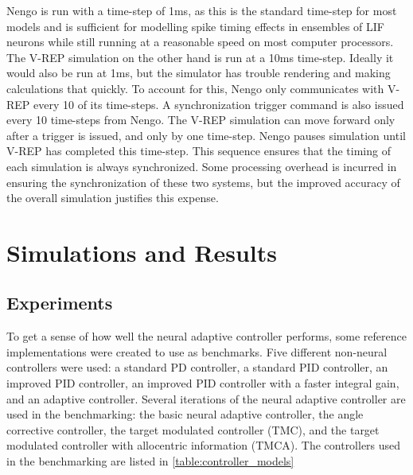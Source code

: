 \documentclass[letterpaper,12pt,titlepage,oneside,final]{book}
\begin{document}
Nengo is run with a time-step of 1ms, as this is the standard time-step for most models and is sufficient for modelling spike timing effects in ensembles of LIF neurons while still running at a reasonable speed on most computer processors. 
The V-REP simulation on the other hand is run at a 10ms time-step. 
Ideally it would also be run at 1ms, but the simulator has trouble rendering and making calculations that quickly. 
To account for this, Nengo only communicates with V-REP every 10 of its time-steps. 
A synchronization trigger command is also issued every 10 time-steps from Nengo. 
The V-REP simulation can move forward only after a trigger is issued, and only by one time-step. 
Nengo pauses simulation until V-REP has completed this time-step. 
This sequence ensures that the timing of each simulation is always synchronized. 
Some processing overhead is incurred in ensuring the synchronization of these two systems, but the improved accuracy of the overall simulation justifies this expense. 

\chapter{Simulations and Results} \label{chap:analysis}

\section{Experiments}


To get a sense of how well the neural adaptive controller performs, some reference implementations were created to use as benchmarks. 
Five different non-neural controllers were used: a standard PD controller, a standard PID controller, an improved PID controller, an improved PID controller with a faster integral gain, and an adaptive controller. 
Several iterations of the neural adaptive controller are used in the benchmarking: the basic neural adaptive controller, the angle corrective controller, the target modulated controller (TMC), and the target modulated controller with allocentric information (TMCA). %
The controllers used in the benchmarking are listed in \autoref{table:controller_models}
\end{document}
